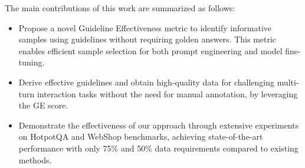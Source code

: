 The main contributions of this work are summarized as follows:
\begin{itemize}
    \item Propose a novel Guideline Effectiveness metric to identify informative samples using guidelines without requiring golden answers. This metric enables efficient sample selection for both prompt engineering and model fine-tuning.

    
    \item Derive effective guidelines and obtain high-quality data for challenging multi-turn interaction tasks without the need for manual annotation, by leveraging the GE score.
    
    \item Demonstrate the effectiveness of our approach through extensive experiments on HotpotQA and WebShop benchmarks, achieving state-of-the-art performance with only 75\% and 50\% data requirements compared to existing methods.
\end{itemize}
